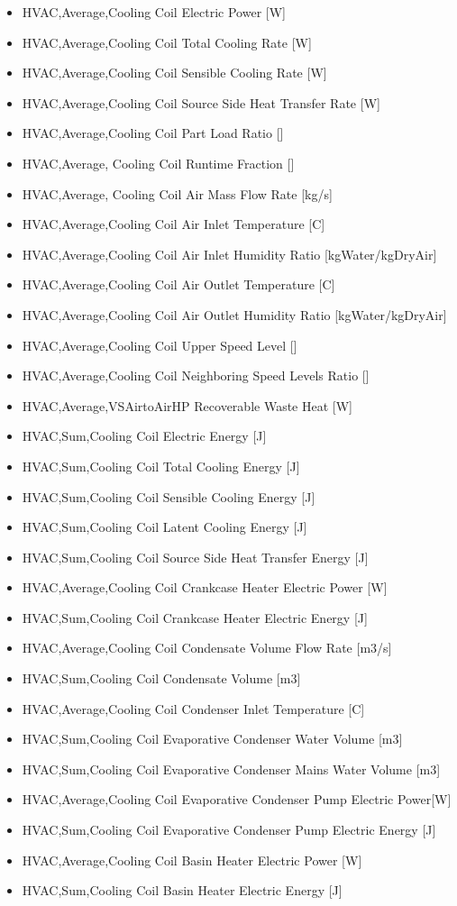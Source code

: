 \begin{itemize}
\item
  HVAC,Average,Cooling Coil Electric Power {[}W{]}
\item
  HVAC,Average,Cooling Coil Total Cooling Rate {[}W{]}
\item
  HVAC,Average,Cooling Coil Sensible Cooling Rate {[}W{]}
\item
  HVAC,Average,Cooling Coil Source Side Heat Transfer Rate {[}W{]}
\item
  HVAC,Average,Cooling Coil Part Load Ratio {[]}
\item
  HVAC,Average, Cooling Coil Runtime Fraction {[]}
\item
  HVAC,Average, Cooling Coil Air Mass Flow Rate {[}kg/s{]}
\item
  HVAC,Average,Cooling Coil Air Inlet Temperature {[}C{]}
\item
  HVAC,Average,Cooling Coil Air Inlet Humidity Ratio {[}kgWater/kgDryAir{]}
\item
  HVAC,Average,Cooling Coil Air Outlet Temperature {[}C{]}
\item
  HVAC,Average,Cooling Coil Air Outlet Humidity Ratio {[}kgWater/kgDryAir{]}
\item
  HVAC,Average,Cooling Coil Upper Speed Level {[]}
\item
  HVAC,Average,Cooling Coil Neighboring Speed Levels Ratio {[]}
\item
  HVAC,Average,VSAirtoAirHP Recoverable Waste Heat {[}W{]}
\item
  HVAC,Sum,Cooling Coil Electric Energy {[}J{]}
\item
  HVAC,Sum,Cooling Coil Total Cooling Energy {[}J{]}
\item
  HVAC,Sum,Cooling Coil Sensible Cooling Energy {[}J{]}
\item
  HVAC,Sum,Cooling Coil Latent Cooling Energy {[}J{]}
\item
  HVAC,Sum,Cooling Coil Source Side Heat Transfer Energy {[}J{]}
\item
  HVAC,Average,Cooling Coil Crankcase Heater Electric Power {[}W{]}
\item
  HVAC,Sum,Cooling Coil Crankcase Heater Electric Energy {[}J{]}
\item
  HVAC,Average,Cooling Coil Condensate Volume Flow Rate {[}m3/s{]}
\item
  HVAC,Sum,Cooling Coil Condensate Volume {[}m3{]}
\item
  HVAC,Average,Cooling Coil Condenser Inlet Temperature {[}C{]}
\item
  HVAC,Sum,Cooling Coil Evaporative Condenser Water Volume {[}m3{]}
\item
  HVAC,Sum,Cooling Coil Evaporative Condenser Mains Water Volume {[}m3{]}
\item
  HVAC,Average,Cooling Coil Evaporative Condenser Pump Electric Power{[}W{]}
\item
  HVAC,Sum,Cooling Coil Evaporative Condenser Pump Electric Energy {[}J{]}
\item
  HVAC,Average,Cooling Coil Basin Heater Electric Power {[}W{]}
\item
  HVAC,Sum,Cooling Coil Basin Heater Electric Energy {[}J{]}
\end{itemize}

